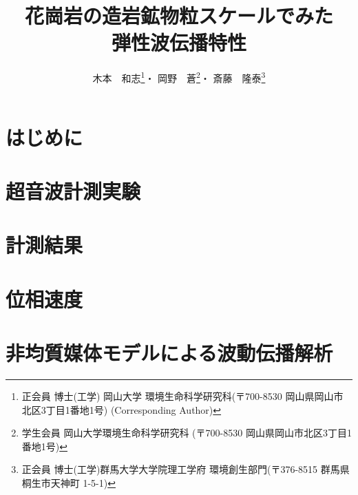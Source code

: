 \documentclass{jsce}
\title{
	花崗岩の造岩鉱物粒スケールでみた\\
	弾性波伝播特性
}%
\author{木本　和志\thanks{正会員 博士(工学) 岡山大学 環境生命科学研究科(〒700-8530 岡山県岡山市北区3丁目1番地1号)\email{kimoto@okayama-u.ac.jp} (Corresponding Author)}・
岡野　蒼\thanks{学生会員 岡山大学環境生命科学研究科 (〒700-8530 岡山県岡山市北区3丁目1番地1号)}・
斎藤　隆泰\thanks{正会員 博士(工学)群馬大学大学院理工学府 環境創生部門(〒376-8515 群馬県桐生市天神町 1-5-1)}
}
\begin{document}
\maketitle
\section{はじめに}
	
\section{超音波計測実験}
	
\section{計測結果}
	
\section{位相速度}
	
\section{非均質媒体モデルによる波動伝播解析}
	
\end{document}
